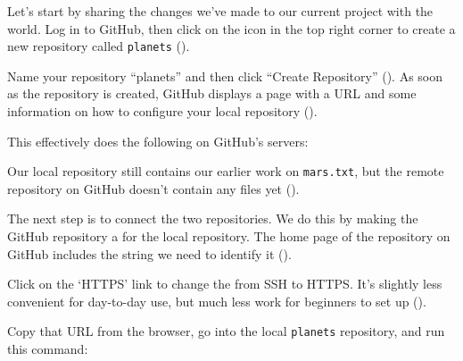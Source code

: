 \documentclass{book}
\begin{document}
Let's start by sharing the changes we've made to our current project
with the world. Log in to GitHub, then click on the icon in the top
right corner to create a new repository called \texttt{planets}
().



Name your repository ``planets'' and then click ``Create Repository'' ().
As soon as the repository is created, GitHub displays a page with a URL
and some information on how to configure your local repository ().


This effectively does the following on GitHub's servers:


Our local repository still contains our earlier work on
\texttt{mars.txt}, but the remote repository on GitHub doesn't contain
any files yet ().


The next step is to connect the two repositories. We do this by making
the GitHub repository a  for the
local repository. The home page of the repository on GitHub includes the
string we need to identify it ().


Click on the `HTTPS' link to change the 
from SSH to HTTPS. It's slightly less convenient for day-to-day use, but
much less work for beginners to set up ().


Copy that URL from the browser, go into the local \texttt{planets}
repository, and run this command:
\end{document}
